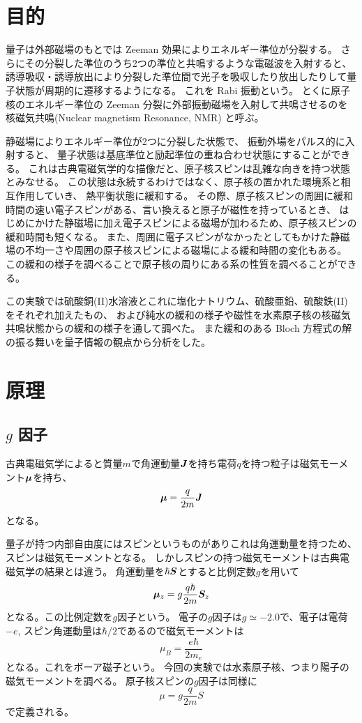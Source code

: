 \documentclass[11pt,dvipdfmx,a4paper]{jsarticle}
\begin{document}
\section{目的}
量子は外部磁場のもとでは Zeeman 効果によりエネルギー準位が分裂する。
さらにその分裂した準位のうち2つの準位と共鳴するような電磁波を入射すると、
誘導吸収・誘導放出により分裂した準位間で光子を吸収したり放出したりして量子状態が周期的に遷移するようになる。
これを Rabi 振動という。
とくに原子核のエネルギー準位の Zeeman 分裂に外部振動磁場を入射して共鳴させるのを
核磁気共鳴(Nuclear magnetism Resonance, NMR) と呼ぶ。

静磁場によりエネルギー準位が2つに分裂した状態で、
振動外場をパルス的に入射すると、
量子状態は基底準位と励起準位の重ね合わせ状態にすることができる。
これは古典電磁気学的な描像だと、原子核スピンは乱雑な向きを持つ状態とみなせる。
この状態は永続するわけではなく、原子核の置かれた環境系と相互作用していき、
熱平衡状態に緩和する。
その際、原子核スピンの周囲に緩和時間の速い電子スピンがある、言い換えると原子が磁性を持っているとき、
はじめにかけた静磁場に加え電子スピンによる磁場が加わるため、原子核スピンの緩和時間も短くなる。
また、周囲に電子スピンがなかったとしてもかけた静磁場の不均一さや周囲の原子核スピンによる磁場による緩和時間の変化もある。
この緩和の様子を調べることで原子核の周りにある系の性質を調べることができる。

この実験では硫酸銅(II)水溶液とこれに塩化ナトリウム、硫酸亜鉛、硫酸鉄(II)をそれぞれ加えたもの、
および純水の緩和の様子や磁性を水素原子核の核磁気共鳴状態からの緩和の様子を通して調べた。
また緩和のある Bloch 方程式の解の振る舞いを量子情報の観点から分析をした。

\section{原理}
\subsection{\(g\) 因子}
古典電磁気学によると質量\(m\)で角運動量\(\vb*{J}\)を持ち電荷\(q\)を持つ粒子は磁気モーメント\(\vb*{\mu}\)を持ち、
\begin{equation}
	\vb*{\mu} = \frac{q}{2m} \vb*{J}
\end{equation}
となる。

量子が持つ内部自由度にはスピンというものがありこれは角運動量を持つため、
スピンは磁気モーメントとなる。
しかしスピンの持つ磁気モーメントは古典電磁気学の結果とは違う。
角運動量を\(\hbar\vb*{S}\)とすると比例定数\(g\)を用いて
\begin{equation}
	\vb*{\mu}_z = g\frac{q\hbar}{2m} \vb*{S}_z
\end{equation}
となる。この比例定数を\(g\)因子という。
電子の\(g\)因子は\(g \simeq -2.0\)で、電子は電荷\(-e\), スピン角運動量は\(\hbar/2\)であるので磁気モーメントは
\begin{equation}
	\mu_B = \frac{e\hbar}{2m_e}
\end{equation}
となる。これをボーア磁子という。
今回の実験では水素原子核、つまり陽子の磁気モーメントを調べる。
原子核スピンの\(g\)因子は同様に
\begin{equation}
	\mu = g \frac{q}{2m} S
\end{equation}
で定義される。
\end{document}
